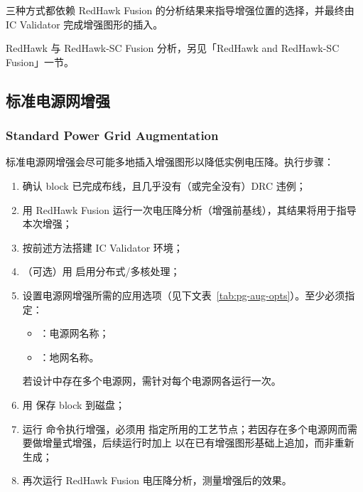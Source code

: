 三种方式都依赖 RedHawk Fusion 的分析结果来指导增强位置的选择，并最终由 IC Validator 完成增强图形的插入。

\begin{seeAlsoBox}
RedHawk 与 RedHawk-SC Fusion 分析，另见「RedHawk and RedHawk-SC Fusion」一节。
\end{seeAlsoBox}

\subsection{标准电源网增强}
\subsubsection*{Standard Power Grid Augmentation}

标准电源网增强会尽可能多地插入增强图形以降低实例电压降。执行步骤：

\begin{enumerate}
  \item 确认 block 已完成布线，且几乎没有（或完全没有）DRC 违例；
  \item 用 RedHawk Fusion 运行一次电压降分析（增强前基线），其结果将用于指导本次增强；
  \item 按前述方法搭建 IC Validator 环境；
  \item （可选）用  启用分布式/多核处理；
  \item 设置电源网增强所需的应用选项（见下文表~\ref{tab:pg-aug-opts}）。至少必须指定：
        \begin{itemize}
          \item {}：电源网名称；
          \item {}：地网名称。
        \end{itemize}
        若设计中存在多个电源网，需针对每个电源网各运行一次。
  \item 用  保存 block 到磁盘；
  \item 运行  命令执行增强，必须用  指定所用的工艺节点；若因存在多个电源网而需要做增量式增强，后续运行时加上  以在已有增强图形基础上追加，而非重新生成；
  \item 再次运行 RedHawk Fusion 电压降分析，测量增强后的效果。
\end{enumerate}

